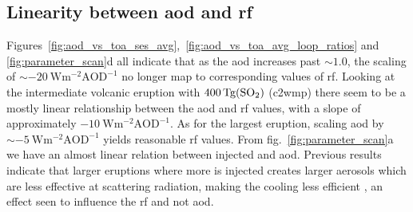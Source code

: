 \documentclass{ametsocV6.1}
\newcommand{\iso}[1][i]{{#1}njected \ce{SO2}}
\begin{document}

\subsection{Linearity between \gls{aod} and \gls{rf}}

Figures~\ref{fig:aod_vs_toa_ses_avg},~\ref{fig:aod_vs_toa_avg_loop_ratios} and
\ref{fig:parameter_scan}d all indicate that as the \gls{aod} increases past \(\sim
1.0\), the scaling of \(\sim \SI{-20}{\watt\metre^{-2}\mathrm{AOD}^{-1}}\) no longer map
to corresponding values of \gls{rf}. Looking at the intermediate volcanic eruption with
\(\SI{400}{\tera\gram(\ce{SO2})}\) (\gls{c2wmp}) there seem to be a mostly linear
relationship between the \gls{aod} and \gls{rf} values, with a slope of approximately
\(\SI{-10}{\watt\metre^{-2}\mathrm{AOD}^{-1}}\). As for the largest eruption, scaling
\gls{aod} by \(\sim \SI{-5}{\watt\metre^{-2}\mathrm{AOD}^{-1}}\) yields reasonable
\gls{rf} values. From fig.~\ref{fig:parameter_scan}a we have an almost linear relation
between \iso{} and \gls{aod}. Previous results indicate that larger eruptions where more
 is injected creates larger aerosols which are less effective at scattering
radiation, making the cooling less efficient
\citep{english2013,timmreck2010,timmreck2018}, an effect seen to influence the \gls{rf}
and not \gls{aod}.
\end{document}
